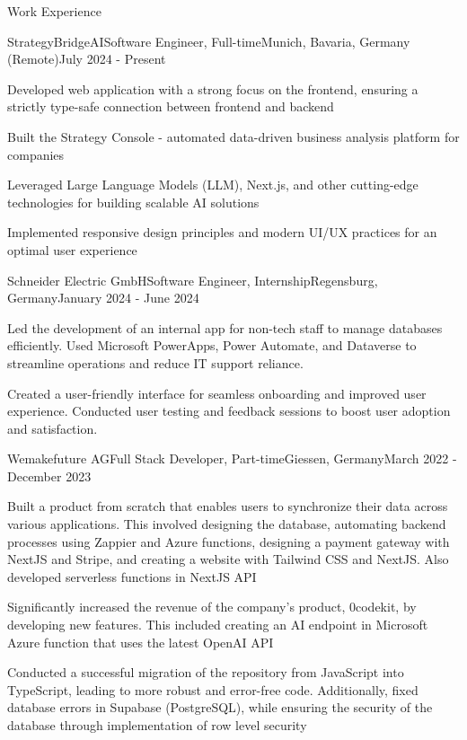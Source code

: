 \documentclass{article}
\newlength{\tabin}
\newlength{\secsep}
\newcommand{\lineunder}{\vspace*{-6pt} \\ \hspace*{-6pt} \hrulefill \\ \vspace*{-15pt}}
\newenvironment{tabbedsection}[1]{
  \begin{list}{}{
      \setlength{\itemsep}{0pt}
      \setlength{\labelsep}{0pt}
      \setlength{\labelwidth}{0pt}
      \setlength{\leftmargin}{\tabin}
      \setlength{\rightmargin}{\tabin}
      \setlength{\listparindent}{0pt}
      \setlength{\parsep}{0pt}
      \setlength{\parskip}{0pt}
      \setlength{\partopsep}{0pt}
      \setlength{\topsep}{#1}
    }
  \item[]
}{\end{list}}
\newenvironment{resume_section}[1]{
  \vspace{1.5\secsep}
  \textsc{\large#1}
  \lineunder
  \begin{tabbedsection}{\secsep}
}{\end{tabbedsection}}
\newenvironment{subitems}{
  \renewcommand{\labelitemi}{-}
  \begin{itemize}
      \setlength{\labelsep}{1em}
}{\end{itemize}}
\newenvironment{resume_employer}[4]{
  \vspace{\secsep}
  \textbf{#1} \\ 
  \indent {\small #2} \hfill {\footnotesize#3 (#4)}
  \begin{tabbedsection}{0pt}
  \begin{subitems}
}{\end{subitems}\end{tabbedsection}}
\begin{document}
    \begin{resume_section}{Work Experience}

    \begin{resume_employer}{StrategyBridgeAI}{Software Engineer, Full-time}{Munich, Bavaria, Germany (Remote)}{July 2024 - Present}
        \item Developed web application with a strong focus on the frontend, ensuring a strictly type-safe connection between frontend and backend
        \item Built the Strategy Console - automated data-driven business analysis platform for companies
        \item Leveraged Large Language Models (LLM), Next.js, and other cutting-edge technologies for building scalable AI solutions
        \item Implemented responsive design principles and modern UI/UX practices for an optimal user experience
      \end{resume_employer}

    \begin{resume_employer}{Schneider Electric GmbH}{Software Engineer, Internship}{Regensburg, Germany}{January 2024 - June 2024}
    \item Led the development of an internal app for non-tech staff to manage databases efficiently. Used Microsoft PowerApps, Power Automate, and Dataverse to streamline operations and reduce IT support reliance.
    
    \item Created a user-friendly interface for seamless onboarding and improved user experience. Conducted user testing and feedback sessions to boost user adoption and satisfaction.
\end{resume_employer}
      
      \begin{resume_employer}{Wemakefuture AG}{Full Stack Developer, Part-time}{Giessen, Germany}{March 2022 - December 2023}
        \item Built a product from scratch that enables users to synchronize their data across various applications. This involved designing the database, automating backend processes using Zappier and Azure functions, designing a payment gateway with NextJS and Stripe, and creating a website with Tailwind CSS and NextJS. Also developed serverless functions in NextJS API
        \item Significantly increased the revenue of the company's product, 0codekit, by developing new features. This included creating an AI endpoint in Microsoft Azure function that uses the latest OpenAI API
        \item Conducted a successful migration of the repository from JavaScript into TypeScript, leading to more robust and error-free code. Additionally, fixed database errors in Supabase (PostgreSQL), while ensuring the security of the database through implementation of row level security
      \end{resume_employer}


\end{resume_section}
\end{document}
